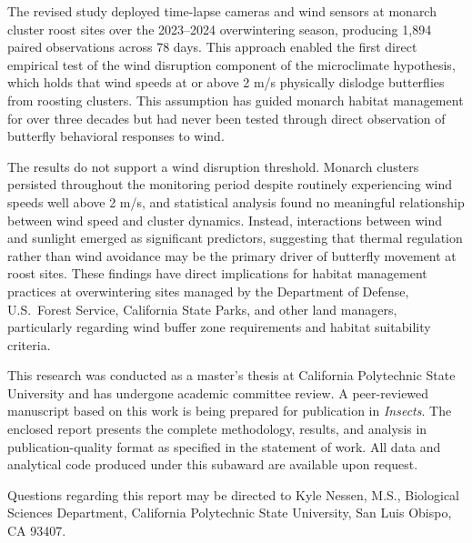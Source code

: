 The revised study deployed time-lapse cameras and wind sensors at monarch cluster roost sites over the 2023--2024 overwintering season, producing 1,894 paired observations across 78 days. This approach enabled the first direct empirical test of the wind disruption component of the microclimate hypothesis, which holds that wind speeds at or above 2 m/s physically dislodge butterflies from roosting clusters. This assumption has guided monarch habitat management for over three decades but had never been tested through direct observation of butterfly behavioral responses to wind.

The results do not support a wind disruption threshold. Monarch clusters persisted throughout the monitoring period despite routinely experiencing wind speeds well above 2 m/s, and statistical analysis found no meaningful relationship between wind speed and cluster dynamics. Instead, interactions between wind and sunlight emerged as significant predictors, suggesting that thermal regulation rather than wind avoidance may be the primary driver of butterfly movement at roost sites. These findings have direct implications for habitat management practices at overwintering sites managed by the Department of Defense, U.S.\ Forest Service, California State Parks, and other land managers, particularly regarding wind buffer zone requirements and habitat suitability criteria.

This research was conducted as a master's thesis at California Polytechnic State University and has undergone academic committee review. A peer-reviewed manuscript based on this work is being prepared for publication in \textit{Insects}. The enclosed report presents the complete methodology, results, and analysis in publication-quality format as specified in the statement of work. All data and analytical code produced under this subaward are available upon request.

Questions regarding this report may be directed to Kyle Nessen, M.S., Biological Sciences Department, California Polytechnic State University, San Luis Obispo, CA 93407.

\vspace{2em}

